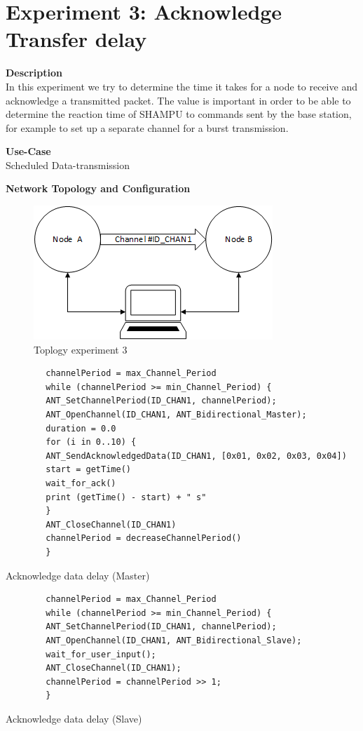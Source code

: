 \section{Experiment 3: Acknowledge Transfer delay}
\begin{description} 
	\item{\textbf{Description}} \hfill \\ In this experiment we try to determine the time it takes for a node to receive and acknowledge a transmitted packet. The value is important in order to be able to determine the reaction time of SHAMPU to commands sent by the base station, for example to set up a separate channel for a burst transmission.
	\item{\textbf{Use-Case}} \hfill \\ Scheduled Data-transmission
	\item{\textbf{Network Topology and Configuration}} \hfill \\ 
	\begin{figure}[h]
		\centering
		\includegraphics[scale=1]{content/images/exp_topo.png}
		\caption{Toplogy experiment 3}
	\end{figure}
	\begin{code}[h]
		\begin{verbatim}
		channelPeriod = max_Channel_Period
		while (channelPeriod >= min_Channel_Period) {
		ANT_SetChannelPeriod(ID_CHAN1, channelPeriod);
		ANT_OpenChannel(ID_CHAN1, ANT_Bidirectional_Master);
		duration = 0.0
		for (i in 0..10) {
		ANT_SendAcknowledgedData(ID_CHAN1, [0x01, 0x02, 0x03, 0x04])
		start = getTime()	   
		wait_for_ack()		
		print (getTime() - start) + " s"	  
		}
		ANT_CloseChannel(ID_CHAN1)		
		channelPeriod = decreaseChannelPeriod()
		} 
		\end{verbatim}
		\caption{Acknowledge data delay (Master)}\label{lst:mExp3}
	\end{code}
	
	\begin{code}[h]
		\begin{verbatim}
		channelPeriod = max_Channel_Period
		while (channelPeriod >= min_Channel_Period) {
		ANT_SetChannelPeriod(ID_CHAN1, channelPeriod);
		ANT_OpenChannel(ID_CHAN1, ANT_Bidirectional_Slave);				 
		wait_for_user_input();
		ANT_CloseChannel(ID_CHAN1);
		channelPeriod = channelPeriod >> 1;
		}
		\end{verbatim}
		\caption{Acknowledge data delay (Slave)}\label{lst:sExp3}
	\end{code}
	

\end{description}
